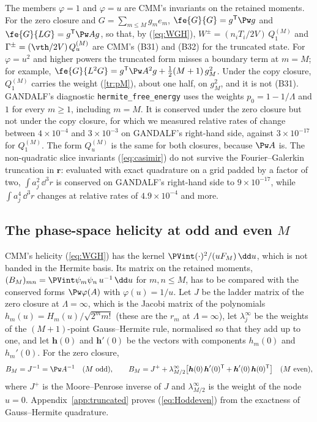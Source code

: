 The members $\varphi=1$ and $\varphi=u$ are CMM's invariants on the retained moments. For the zero closure and $G=\sum_{m\le M}g_me_m$, $\fe{G}{G}=g^{\mathsf T}\Pw g$ and $\fe{G}{LG}=g^{\mathsf T}\Pw Ag$, so that, by (\ref{eq:WGH}), $W^\pm=(n_iT_i/2V)\,Q^{(M)}_1$ and $\Gamma^\pm=(\vth/2V)\,Q^{(M)}_u$ are CMM's (B31) and (B32) for the truncated state. For $\varphi=u^2$ and higher powers the truncated form misses a boundary term at $m=M$; for example, $\fe{G}{L^2G}=g^{\mathsf T}\Pw A^2g+\frac12(M+1)\,g_M^2$. Under the copy closure, $Q^{(M)}_1$ carries the weight (\ref{tr:pM}), about one half, on $g_M^2$, and it is not (B31). GANDALF's diagnostic \texttt{hermite\_free\_energy} uses the weights $p_0=1-1/\Lambda$ and $1$ for every $m\ge1$, including $m=M$. It is conserved under the zero closure but not under the copy closure, for which we measured relative rates of change between $4\times10^{-4}$ and $3\times10^{-3}$ on GANDALF's right-hand side, against $3\times10^{-17}$ for $Q^{(M)}_1$. The form $Q^{(M)}_u$ is the same for both closures, because $\Pw A$ is. The non-quadratic slice invariants (\ref{eq:casimir}) do not survive the Fourier--Galerkin truncation in $\boldsymbol r$: evaluated with exact quadrature on a grid padded by a factor of two, $\int a_j^2\,\dd^3r$ is conserved on GANDALF's right-hand side to $9\times10^{-17}$, while $\int a_j^4\,\dd^3r$ changes at relative rates of $4.9\times10^{-4}$ and more.

\subsection{The phase-space helicity at odd and even \texorpdfstring{$M$}{M}}\label{tr:helsec}

CMM's helicity (\ref{eq:WGH}) has the kernel $\PVint(\cdot)^2/(uF_M)\,\dd u$, which is not banded in the Hermite basis. Its matrix on the retained moments, $(B_M)_{mn}=\PVint\psi_m\psi_n\,u^{-1}\,\dd u$ for $m,n\le M$, has to be compared with the conserved forms $\Pw\varphi(A)$ with $\varphi(u)=1/u$. Let $J$ be the ladder matrix of the zero closure at $\Lambda=\infty$, which is the Jacobi matrix of the polynomials $h_m(u)=H_m(u)/\sqrt{2^mm!}$ (these are the $r_m$ at $\Lambda=\infty$), let $\lambda^\infty_j$ be the weights of the $(M+1)$-point Gauss--Hermite rule, normalised so that they add up to one, and let $\boldsymbol h(0)$ and $\boldsymbol h'(0)$ be the vectors with components $h_m(0)$ and $h_m'(0)$. For the zero closure,
\begin{equation}\label{eq:Hoddeven}
  B_M=J^{-1}=\Pw A^{-1}\quad(M\ \text{odd}),\qquad
  B_M=J^{+}+\lambda^\infty_{M/2}\big[\boldsymbol h(0)\,\boldsymbol h'(0)^{\mathsf T}+\boldsymbol h'(0)\,\boldsymbol h(0)^{\mathsf T}\big]\quad(M\ \text{even}),
\end{equation}
where $J^+$ is the Moore--Penrose inverse of $J$ and $\lambda^\infty_{M/2}$ is the weight of the node $u=0$. Appendix~\ref{app:truncated} proves (\ref{eq:Hoddeven}) from the exactness of Gauss--Hermite quadrature.

